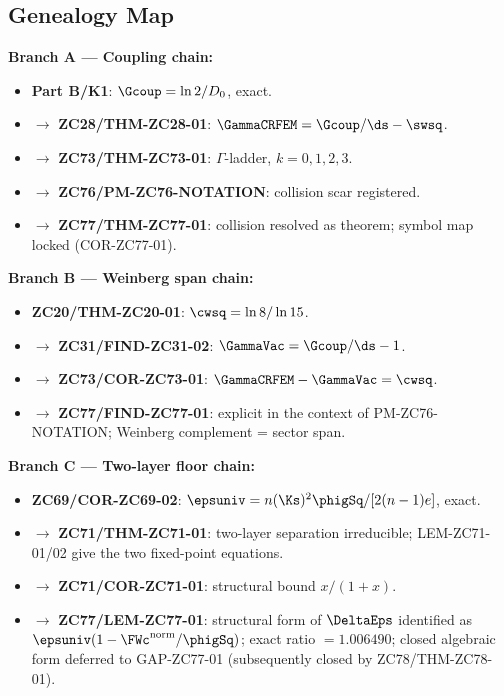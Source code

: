 \documentclass[12pt, a4paper]{article}
\begin{document}
\subsection{Genealogy Map}
\label{sec:genealogy}

\begin{genealogybox}[title={How ZC77's Key Objects Trace Back}]

\textbf{Branch A --- Coupling chain:}
\begin{itemize}[leftmargin=2em, noitemsep]
  \item \textbf{Part B/K1}: $\Gcoup = \ln2/D_0$, exact.
  \item $\to$ \textbf{ZC28/THM-ZC28-01}: $\GammaCRFEM = \Gcoup/\ds
    - \swsq$.
  \item $\to$ \textbf{ZC73/THM-ZC73-01}: $\Gamma$-ladder, $k=0,1,2,3$.
  \item $\to$ \textbf{ZC76/PM-ZC76-NOTATION}: collision scar registered.
  \item $\to$ \textbf{ZC77/THM-ZC77-01}: collision resolved as theorem;
    symbol map locked (COR-ZC77-01).
\end{itemize}

\textbf{Branch B --- Weinberg span chain:}
\begin{itemize}[leftmargin=2em, noitemsep]
  \item \textbf{ZC20/THM-ZC20-01}: $\cwsq = \ln8/\ln15$.
  \item $\to$ \textbf{ZC31/FIND-ZC31-02}: $\GammaVac = \Gcoup/\ds - 1$.
  \item $\to$ \textbf{ZC73/COR-ZC73-01}: $\GammaCRFEM - \GammaVac = \cwsq$.
  \item $\to$ \textbf{ZC77/FIND-ZC77-01}: explicit in the context of
    PM-ZC76-NOTATION; Weinberg complement = sector span.
\end{itemize}

\textbf{Branch C --- Two-layer floor chain:}
\begin{itemize}[leftmargin=2em, noitemsep]
  \item \textbf{ZC69/COR-ZC69-02}: $\epsuniv = n(\Ks)^2\phigSq/[2(n-1)e]$,
    exact.
  \item $\to$ \textbf{ZC71/THM-ZC71-01}: two-layer separation irreducible;
    LEM-ZC71-01/02 give the two fixed-point equations.
  \item $\to$ \textbf{ZC71/COR-ZC71-01}: structural bound $x/(1+x)$.
  \item $\to$ \textbf{ZC77/LEM-ZC77-01}: structural form of $\DeltaEps$
    identified as $\epsuniv(1 - \FWc^{\rm norm}/\phigSq)$;
    exact ratio $= 1.006490$; closed algebraic form deferred to
    GAP-ZC77-01 (subsequently closed by ZC78/THM-ZC78-01).
\end{itemize}


\end{genealogybox}
\end{document}
